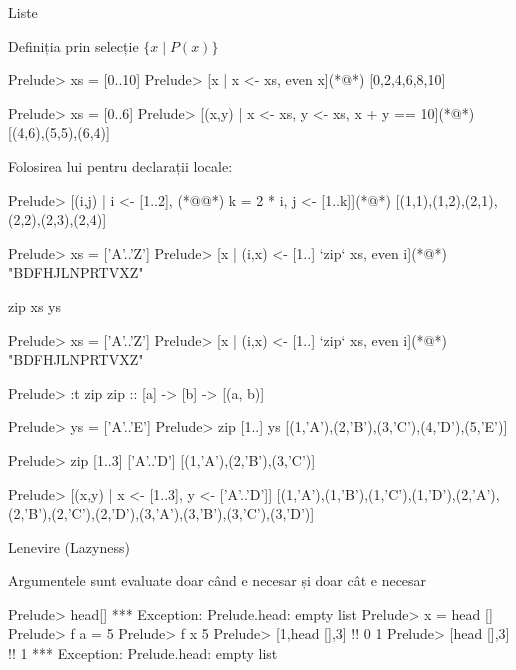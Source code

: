 \documentclass[xcolor=pdftex,romanian,colorlinks]{beamer}
\begin{document}
\begin{section}{Liste}
\begin{frame}[fragile]{Definiția prin selecție $\{x\mid P(x)\}$}
  \begin{asciihs}
  Prelude> xs = [0..10]
  Prelude> [x | x <- xs, even x](*@\pause@*)
  [0,2,4,6,8,10]
  
  Prelude> xs = [0..6]
  Prelude> [(x,y) | x <- xs, y <- xs,  x + y == 10](*@\pause@*)
  [(4,6),(5,5),(6,4)]
  \end{asciihs}
  Folosirea lui  pentru declarații locale:
  \begin{asciihs}
  Prelude> [(i,j) | i <- [1..2], (*@\color{blue}{let}@*) k = 2 * i, j <- [1..k]](*@\pause@*)
  [(1,1),(1,2),(2,1),(2,2),(2,3),(2,4)]
  
  Prelude> xs = ['A'..'Z']
  Prelude> [x | (i,x) <- [1..] `zip` xs, even i](*@\pause@*)
  "BDFHJLNPRTVXZ"
  \end{asciihs}
  
  \end{frame}
  
  
  \begin{frame}[fragile]{zip xs ys}
  \begin{asciihs}
  Prelude> xs = ['A'..'Z']
  Prelude> [x | (i,x) <- [1..] `zip` xs, even i](*@\pause@*)
  "BDFHJLNPRTVXZ"
  
  Prelude> :t zip
  zip :: [a] -> [b] -> [(a, b)]
  
  Prelude> ys = ['A'..'E']
  Prelude> zip [1..]  ys
  [(1,'A'),(2,'B'),(3,'C'),(4,'D'),(5,'E')]
  \end{asciihs}
  
  \medskip\pause
  
  
  \begin{asciihs}
  Prelude> zip [1..3] ['A'..'D']
  [(1,'A'),(2,'B'),(3,'C')]
  
  Prelude> [(x,y) | x <- [1..3], y <- ['A'..'D']]
  [(1,'A'),(1,'B'),(1,'C'),(1,'D'),(2,'A'),(2,'B'),(2,'C'),(2,'D'),(3,'A'),(3,'B'),(3,'C'),(3,'D')]
  \end{asciihs}
  
  \end{frame}
  
  \begin{frame}[fragile]{Lenevire (Lazyness)}
  
   Argumentele sunt evaluate doar când e necesar și doar cât e necesar
  
  
  \begin{asciihs}
  Prelude> head[]
  *** Exception: Prelude.head: empty list
  Prelude> x = head []
  Prelude> f a = 5
  Prelude> f x
  5
  Prelude> [1,head [],3] !! 0
  1
  Prelude> [head [],3] !! 1
  *** Exception: Prelude.head: empty list
  \end{asciihs}
  

\end{frame}
\end{section}
\end{document}
